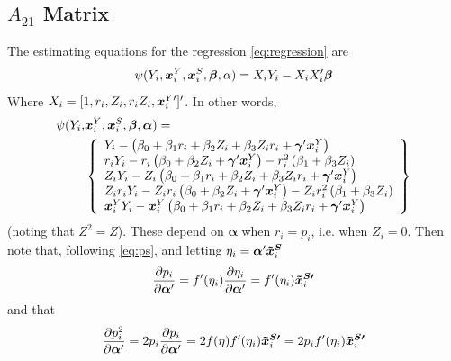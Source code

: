 \documentclass[]{article}
\begin{document}
\subsection*{$A_{21}$ Matrix}
The estimating equations for the regression \eqref{eq:regression} are
\begin{equation}\label{eq:eeOLS}
  \psi(Y_i,\bm{x}^Y_i,\bm{x}^S_i,\bm{\beta},\alpha)=X_iY_i-X_iX_i'\bm{\beta}
\end{equation}
Where $X_i=[1,r_i,Z_i,r_iZ_i,\bm{x}^{Y\prime}_i]'$.
In other words,
\begin{align*}
  \psi(Y_i,&\bm{x}^Y_i,\bm{x}^S_i,\bm{\beta},\bm{\alpha})=\\
  &\left\{
  \begin{array}{l}
    Y_i-\left(\beta_0+\beta_1r_i+\beta_2Z_i+\beta_3Z_ir_i+\bm{\gamma}'\bm{x}^Y_i\right)\\
    r_iY_i-r_i\left(\beta_0+\beta_2Z_i+\bm{\gamma}'\bm{x}^Y_i\right)-r_i^2\left(\beta_1+\beta_3Z_i\right)\\
    Z_iY_i-Z_i\left(\beta_0+\beta_1r_i+\beta_2Z_i+\beta_3Z_ir_i+\bm{\gamma}'\bm{x}^Y_i\right)\\
    Z_ir_iY_i-Z_ir_i\left(\beta_0+\beta_2Z_i+\bm{\gamma}'\bm{x}^Y_i\right)-Z_ir_i^2\left(\beta_1+\beta_3Z_i\right)\\
    \bm{x}^Y_iY_i-\bm{x}^Y_i\left(\beta_0+\beta_1r_i+\beta_2Z_i+\beta_3Z_ir_i+\bm{\gamma}'\bm{x}^Y_i\right)
  \end{array}
  \right\}
\end{align*}
(noting that $Z^2=Z$).
These depend on $\bm{\alpha}$ when $r_i=p_i$, i.e. when $Z_i=0$.%
Then note that, following \eqref{eq:ps}, and letting $\eta_i=\bm{\alpha}'\bm{\tilde{x}^S}_i$
\begin{equation}\label{eq:derivP}
  \frac{\partial p_i}{\partial \bm{\alpha}'}=f'(\eta_i)\frac{\partial \eta_i}{\partial \bm{\alpha}'}=f'(\eta_i)\bm{\tilde{x}^{S\prime}}_i
\end{equation}
and that
\begin{equation}
  \frac{\partial p_i^2}{\partial \bm{\alpha}'}=2p_i\frac{\partial p_i}{\partial \bm{\alpha}'}=2f(\eta)f'(\eta_i)\bm{\tilde{x}^{S\prime}}_i=2p_if'(\eta_i)\bm{\tilde{x}^{S\prime}}_i
\end{equation}
\end{document}
